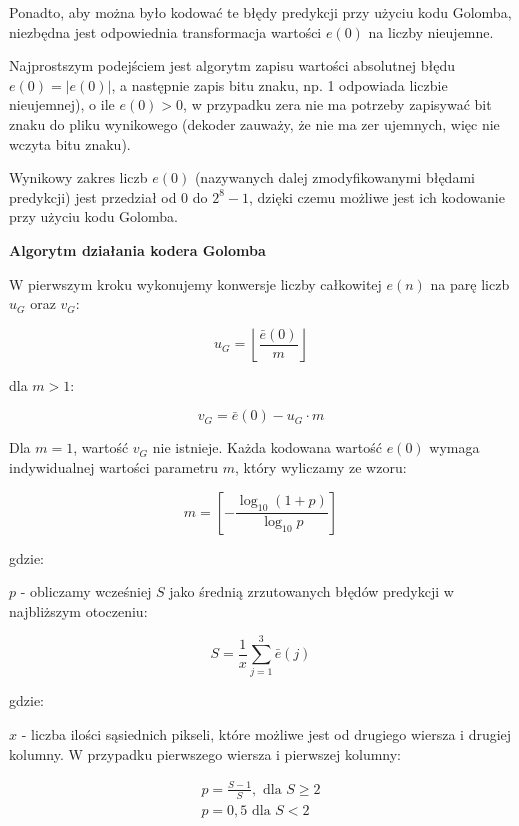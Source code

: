 \documentclass{article}
\begin{document}
Ponadto, aby można było kodować te błędy predykcji przy użyciu kodu Golomba, niezbędna jest odpowiednia transformacja wartości $e(0)$ na liczby nieujemne.

Najprostszym podejściem jest algorytm zapisu wartości absolutnej błędu $e(0)=|e(0)|$, a następnie zapis bitu znaku, np. 1 odpowiada liczbie nieujemnej), o ile $e(0)>0$, w przypadku zera nie ma potrzeby zapisywać bit znaku do pliku wynikowego (dekoder zauważy, że nie ma zer ujemnych, więc nie wczyta bitu znaku).

Wynikowy zakres liczb $e(0)$ (nazywanych dalej zmodyfikowanymi błędami predykcji) jest przedział od $0$ do $2^8 - 1$, dzięki czemu możliwe jest ich kodowanie przy użyciu kodu Golomba.

\textbf{Algorytm działania kodera Golomba}

W pierwszym kroku wykonujemy konwersje liczby całkowitej $e(n)$ na parę liczb $u_G$ oraz $v_G$:
  
\begin{equation}
u_{G}=\left\lfloor\frac{\bar{e}(0)}{m}\right\rfloor
\end{equation}	
  
dla $m > 1$:
  
\begin{equation}
v_{G}=\bar{e}(0)-u_{G} \cdot m
\end{equation}	
  
Dla $m = 1$, wartość $v_G$ nie istnieje. Każda kodowana wartość $e(0)$ wymaga indywidualnej wartości parametru $m$, który wyliczamy ze wzoru:
  
\begin{equation}
m=\left[-\frac{\log_{10}(1+p)}{\log_{10} p}\right]
\end{equation}
  
gdzie:

$p$ - obliczamy wcześniej $S$ jako średnią zrzutowanych błędów predykcji w najbliższym otoczeniu:
  
\begin{equation}
S=\frac{1}{x} \sum_{j=1}^{3} \bar{e}(j)
\end{equation}
  
gdzie:
  
$x$ - liczba ilości sąsiednich pikseli, które możliwe jest od drugiego wiersza i drugiej kolumny. W przypadku pierwszego wiersza i pierwszej kolumny:

\begin{equation}
\begin{array}{l}
p=\frac{S-1}{S}, \text { dla } S \geq 2 \\
p=0,5 \text { dla } S<2
\end{array}
\end{equation}
\end{document}
